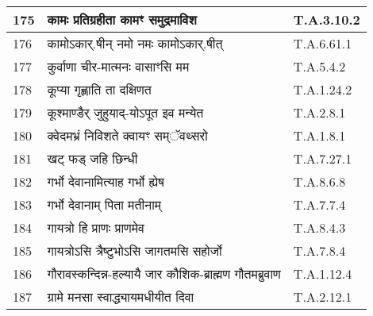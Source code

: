 \documentclass[17pt]{extarticle}
\begin{document}
\begin{longtable}{||p{0.4in}||p{4.9in}||p{0.9in}||}
    \hline
        
    175 & कामः प्रतिग्रहीता कामꣳ समुद्रमाविश & T.A.3.10.2       \\
    
    \hline
        
    176 & कामोऽकार्.षीन् नमो नमः कामोऽकार्.षीत् & T.A.6.61.1       \\
    
    \hline
        
    177 & कुर्वाणा चीर{-}मात्मनः वासाꣳसि मम & T.A.5.4.2       \\
    
    \hline
        
    178 & कूप्या गृह्णाति ता दक्षिणत & T.A.1.24.2       \\
    
    \hline
        
    179 & कूश्माण्डैर् जुहुयाद्{-}योऽपूत इव मन्येत & T.A.2.8.1       \\
    
    \hline
        
    180 & क्वेदमभ्रं निविशते क्वायꣳ सम्ॅवथ्सरो & T.A.1.8.1       \\
    
    \hline
        
    181 & खट् फड् जहि छिन्धी & T.A.7.27.1       \\
    
    \hline
        
    182 & गर्भो देवानामित्याह गर्भो ह्येष & T.A.8.6.8       \\
    
    \hline
        
    183 & गर्भो देवानाम् पिता मतीनाम् & T.A.7.7.4       \\
    
    \hline
        
    184 & गायत्रो हि प्राणः प्राणमेव & T.A.8.4.3       \\
    
    \hline
        
    185 & गायत्रोऽसि त्रैष्टुभोऽसि जागतमसि सहोर्जो & T.A.7.8.4       \\
    
    \hline
        
    186 & गौरावस्कन्दिन्न{-}हल्यायै जार कौशिक{-}ब्राह्मण गौतमब्रुवाण & T.A.1.12.4       \\
    
    \hline
        
    187 & ग्रामे मनसा स्वाद्ध्यायमधीयीत दिवा & T.A.2.12.1       \\
    

\end{longtable}
\end{document}
